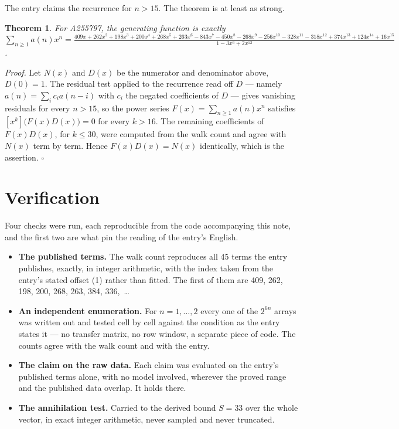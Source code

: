 \documentclass[11pt]{article}
\newtheorem{theorem}{Theorem}
\theoremstyle{definition}
\begin{document}
The entry claims the recurrence for $n > 15$. The theorem is at least as strong.

\begin{theorem} For A255797, the generating function is exactly $\sum_{n\ge 1} a(n)x^n = \frac{409x + 262x^{2} + 198x^{3} + 200x^{4} + 268x^{5} + 263x^{6} - 843x^{7} - 450x^{8} - 268x^{9} - 256x^{10} - 328x^{11} - 318x^{12} + 374x^{13} + 124x^{14} + 16x^{15}}{1 - 3x^{6} + 2x^{12}}$.\end{theorem}

{\itshape Proof.} Let $N(x)$ and $D(x)$ be the numerator and denominator above, $D(0)=1$. The residual test applied to the recurrence read off $D$ --- namely $a(n) = \sum_i c_i a(n-i)$ with $c_i$ the negated coefficients of $D$ --- gives vanishing residuals for every $n > 15$, so the power series $F(x)=\sum_{n\ge 1}a(n)x^n$ satisfies $[x^k]\bigl(F(x)D(x)\bigr) = 0$ for every $k > 16$. The remaining coefficients of $F(x)D(x)$, for $k \le 30$, were computed from the walk count and agree with $N(x)$ term by term. Hence $F(x)D(x) = N(x)$ identically, which is the assertion. $\square$

\section{Verification}

Four checks were run, each reproducible from the code accompanying this note, and the first two are what pin the reading of the entry's English.

\begin{itemize}

\item {\bfseries The published terms.} The walk count reproduces all 45 terms the entry publishes, exactly, in integer arithmetic, with the index taken from the entry's stated offset (1) rather than fitted. The first of them are 409, 262, 198, 200, 268, 263, 384, 336,~\dots

\item {\bfseries An independent enumeration.} For $n = 1,\dots,2$ every one of the $2^{6n}$ arrays was written out and tested cell by cell against the condition as the entry states it --- no transfer matrix, no row window, a separate piece of code. The counts agree with the walk count and with the entry.

\item {\bfseries The claim on the raw data.} Each claim was evaluated on the entry's published terms alone, with no model involved, wherever the proved range and the published data overlap. It holds there.

\item {\bfseries The annihilation test.} Carried to the derived bound $S = 33$ over the whole vector, in exact integer arithmetic, never sampled and never truncated.

\end{itemize}
\end{document}
